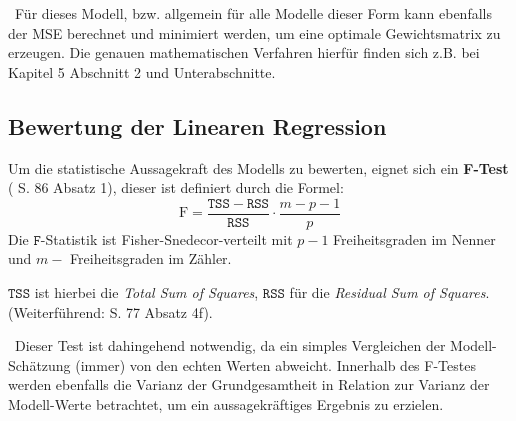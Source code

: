 ~\newline Für dieses Modell, bzw. allgemein für alle Modelle dieser Form kann ebenfalls der MSE berechnet und minimiert werden, um eine optimale Gewichtsmatrix zu erzeugen. Die genauen mathematischen Verfahren hierfür finden sich z.B. bei \cite{stroetmann} Kapitel 5 Abschnitt 2 und Unterabschnitte.
\subsection{Bewertung der Linearen Regression}
Um die statistische Aussagekraft des Modells zu bewerten, eignet sich ein \textbf{F-Test} (\cite{stroetmann} S. 86 Absatz 1), dieser ist definiert durch die Formel:
\begin{equation}
\label{eq:F-statistic}
\mathrm{F} = \frac{\mathtt{TSS} - \mathtt{RSS}}{\mathtt{RSS}} \cdot \frac{m - p - 1}{p}
\end{equation}
Die $\mathtt{F}$-Statistik ist Fisher-Snedecor-verteilt mit $p-1$ Freiheitsgraden im Nenner und $m-$ Freiheitsgraden im Zähler. 

$\mathtt{TSS}$ ist hierbei die \textit{Total Sum of Squares}, $\mathtt{RSS}$ für die \textit{Residual Sum of Squares}. (Weiterführend: \cite{stroetmann} S. 77 Absatz 4f). 

~\newline Dieser Test ist dahingehend notwendig, da ein simples Vergleichen der Modell-Schätzung (immer) von den echten Werten abweicht. Innerhalb des F-Testes werden ebenfalls die Varianz der Grundgesamtheit in Relation zur Varianz der Modell-Werte betrachtet, um ein aussagekräftiges Ergebnis zu erzielen.  